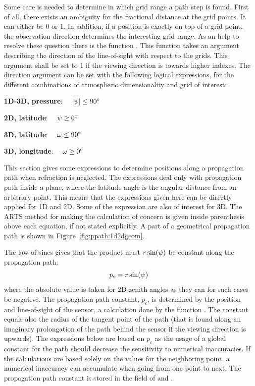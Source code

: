 Some care is needed to determine in which grid range a path step is
found. First of all, there exists an ambiguity for the fractional
distance at the grid points. It can either be 0 or 1. In addition, if
a position is exactly on top of a grid point, the observation
direction determines the interesting grid range. As an help to resolve
these question there is the function .
This function takes an argument describing the direction of the
line-of-sight with respect to the grids. This argument shall be set to
1 if the viewing direction is towards higher indexes. The direction
argument can be set with the following logical expressions, for the
different combinations of atmospheric dimensionality and grid of
interest:

 {\bf 1D-3D, pressure}: $\quad |\psi| \leq 90^\circ$

 {\bf 2D, latitude}: $\quad \psi \geq 0^\circ$

 {\bf 3D, latitude}: $\quad \omega \leq 90^\circ$

 {\bf 3D, longitude}: $\quad \omega \geq 0^\circ$





\label{sec:ppath:basicgeom}

This section gives some expressions to determine positions along a
propagation path when refraction is neglected. The expressions deal
only with propagation path inside a plane, where the latitude angle is
the angular distance from an arbitrary point. This means that the
expressions given here can be directly applied for 1D and 2D. Some of
the expression are also of interest for 3D. The ARTS method for making
the calculation of concern is given inside parenthesis above each
equation, if not stated explicitly. A part of a geometrical
propagation path is shown in Figure~\ref{fig:ppath:1d2dgeom}.

The law of sines gives that the product must $r\sin(\psi)$ be
constant along the propagation path:
\begin{equation}
  p_c = r\sin(\psi)
  \label{eq:ppath:geomconst}
\end{equation}
where the absolute value is taken for 2D zenith angles as they can for
such cases be negative. The propagation path constant, $p_c$, is
determined by the position and line-of-sight of the sensor, a
calculation done by the function . The
constant equals also the radius of the tangent point of the path (that
is found along an imaginary prolongation of the path behind the sensor
if the viewing direction is upwards). The expressions below are based
on $p_c$ as the usage of a global constant for the path should
decrease the sensitivity to numerical inaccuracies. If the
calculations are based solely on the values for the neighboring
point, a numerical inaccuracy can accumulate when going from one point
to next. The propagation path constant is stored in the field
 of  and .

